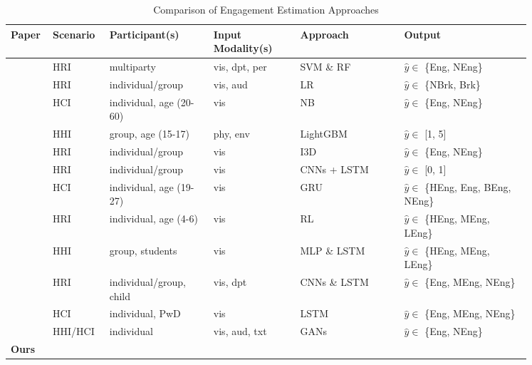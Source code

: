 \documentclass[10pt,journal,compsoc]{IEEEtran}
\begin{document}
\begin{table}[t]
  \renewcommand{\arraystretch}{1.3}
  \centering
  \caption{Comparison of Engagement Estimation Approaches}
  \label{t:references}
  \begin{threeparttable}[b]
  \begin{tabular}{p{0.04\linewidth}p{0.08\linewidth}p{0.18\linewidth}p{0.15\linewidth}p{0.18\linewidth}p{0.22\linewidth}}
  \toprule
  \textbf{Paper} &
  \textbf{Scenario} &
  \textbf{Participant(s)}\tnote{1} &
  \textbf{Input Modality(s)}\tnote{2} &
  \textbf{Approach} \tnote{3} &
  \textbf{Output}\tnote{4} \\
  \midrule
  \cite{Salam2017Fully} &
  HRI &
  multiparty &
  vis, dpt, per &
  SVM \& RF &
  $\hat{y} \in$ \{Eng, NEng\} \\
  \cite{BenYoussef2019Early} &
  HRI &
  individual/group &
  vis, aud &
  LR &
  $\hat{y} \in$ \{NBrk, Brk\} \\
  \cite{Monkaresi2017Automated} &
  HCI &
  individual, age (20-60) &
  vis &
  NB &
  $\hat{y} \in$ \{Eng, NEng\} \\
  \cite{Gao2020NGage} &
  HHI &
  group, age (15-17) &
  phy, env &
  LightGBM &
  $\hat{y} \in$ [1, 5] \\
  \midrule
  \cite{Saleh2021Improving} &
  HRI &
  individual/group &
  vis &
  I3D &
  $\hat{y} \in$ \{Eng, NEng\} \\
  \cite{DelDuchetto2020Are} &
  HRI &
  individual/group &
  vis &
  CNNs + LSTM &
  $\hat{y} \in$ [0, 1] \\
  \cite{Zhu2020Multirate} &
  HCI &
  individual, age (19-27) &
  vis &
  GRU &
  $\hat{y} \in$ \{HEng, Eng, BEng, NEng\} \\
  \cite{Rudovic2019Personalized} &
  HRI &
  individual, age (4-6) &
  vis &
  RL &
  $\hat{y} \in$ \{HEng, MEng, LEng\} \\
  \cite{Sumer2021Multimodal} &
  HHI &
  group, students &
  vis &
  MLP \& LSTM &
  $\hat{y} \in$ \{HEng, MEng, LEng\} \\
  \cite{Anagnostopoulou2021Engagement} &
  HRI &
  individual/group, child &
  vis, dpt &
  CNNs \& LSTM &
  $\hat{y} \in$ \{Eng, MEng, NEng\} \\
  \cite{Steinert2020Engagement} &
  HCI &
  individual, PwD &
  vis &
  LSTM &
  $\hat{y} \in$ \{Eng, MEng, NEng\} \\
  \cite{Guhan2020ABCNet} &
  HHI/HCI &
  individual &
  vis, aud, txt &
  GANs &
  $\hat{y} \in$ \{Eng, NEng\} \\
  \midrule
  \textbf{Ours} &

\end{tabular}
\end{threeparttable}
\end{table}
\end{document}
